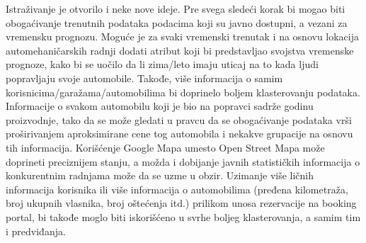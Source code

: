 \documentclass[12pt,oneside]{memoir}
\begin{document}
Istraživanje je otvorilo i neke nove ideje. Pre svega sledeći korak bi mogao biti obogaćivanje trenutnih podataka podacima koji su javno dostupni, a vezani za vremensku prognozu. Moguće je za svaki vremenski trenutak i na osnovu lokacija automehaničarskih radnji dodati atribut koji bi predstavljao svojstva vremenske prognoze, kako bi se uočilo da li zima/leto imaju uticaj na to kada ljudi popravljaju svoje automobile. Takođe, više informacija o samim korisnicima/garažama/automobilima bi doprinelo boljem klasterovanju podataka. Informacije o svakom automobilu koji je bio na popravci sadrže godinu proizvodnje, tako da se može gledati u pravcu da se obogaćivanje podataka vrši proširivanjem aproksimirane cene tog automobila i nekakve grupacije na osnovu tih informacija. Korišćenje Google Mapa umesto Open Street Mapa može doprineti preciznijem stanju, a možda i dobijanje javnih statističkih informacija o konkurentnim radnjama može da se uzme u obzir. Uzimanje više ličnih informacija korisnika ili više informacija o automobilima (pređena kilometraža, broj ukupnih vlasnika, broj oštećenja itd.) prilikom unosa rezervacije na booking portal, bi takođe moglo biti iskorišćeno u svrhe boljeg klasterovanja, a samim tim i predviđanja.

\literatura

\backmatter
\end{document}
